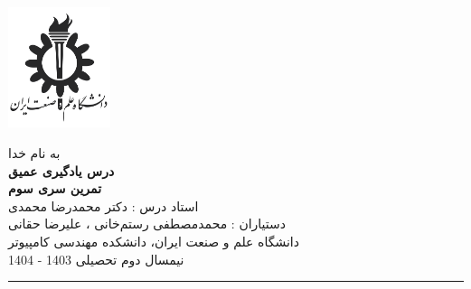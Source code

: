 \begin{minipage}{0.1\textwidth}
\includegraphics[width=3cm]{etc/IUST}
\end{minipage}%
\hfill%
\begin{minipage}{0.6\textwidth}\centering
\fontsize{13pt}{13pt}\selectfont
به‌ نام خدا \\
\textbf{درس یادگیری عمیق} \\
\textbf{تمرین سری سوم}\\
استاد درس : دکتر محمدرضا محمدی \\
دستیاران :  محمدمصطفی رستم‌خانی ، علیرضا حقانی\\
\vspace{0.25cm}
\begingroup
\fontsize{11pt}{11pt}\selectfont
دانشگاه علم و صنعت ایران، دانشکده مهندسی کامپیوتر \\
نیمسال دوم تحصیلی 1403 - 1404 \\
\endgroup
\end{minipage}%
\hfill%
\begin{minipage}{0.1\textwidth}

\end{minipage}

\vspace{0.5cm}

\noindent\rule{\textwidth}{1pt}
